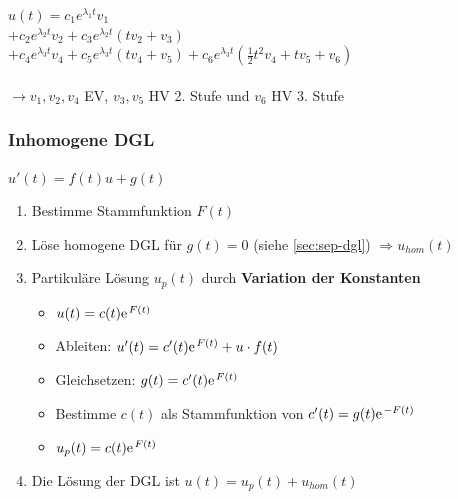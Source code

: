 \documentclass[6pt,a4paper]{scrartcl}
\renewcommand{\emph}[1]{\textbf{#1}}															%
\newcommand{\ra}[0]{\ensuremath{\rightarrow}} 									%
\begin{document}
\begin{multicols*}{4}
$u (t) = c_1 e^{\lambda_1 t} v_1$ \\
$+ c_2 e^{\lambda_2 t} v_2 + c_3 e^{\lambda_2 t}(tv_2 + v_3)$ \\
$+ c_4 e^{\lambda_3 t} v_4 + c_5 e^{\lambda_3 t}(tv_4 + v_5) + c_6 e^{\lambda_3 t} (\frac{1}{2} t^2 v_4 + tv_5 + v_6)$ \\
\\ \ra  $v_1, v_2, v_4$ EV, $v_3, v_5$ HV 2. Stufe und $v_6$ HV 3. Stufe
\fi
\subsubsection{Inhomogene DGL}
$\boxed{u'(t) = f(t)u + g(t)}$

\begin{enumerate}
	\itemsep0pt 
	\item Bestimme Stammfunktion $F(t)$
	\item Löse homogene DGL für $g(t) = 0$ (siehe \ref{sec:sep-dgl}) $\Rightarrow u_{hom}(t)$
	\item Partikuläre Lösung $u_p(t)$ durch \emph{Variation der Konstanten}
	\begin{itemize}\itemsep0pt 
		\item $u(t) = c(t) \e^{F(t)}$
		\item Ableiten: $u'(t) = c'(t)\e^{F(t)}+u\cdot f(t)$
		\item Gleichsetzen: $g(t) = c'(t)\e^{F(t)}$
		\item Bestimme $c(t)$ als Stammfunktion von $c'(t) = g(t)\e^{-F(t)}$
		\item $u_p(t) = c(t)\e^{F(t)}$
	\end{itemize}
	\item Die Lösung der DGL ist $u(t) = u_p(t) + u_{hom}(t)$
\end{enumerate}


\end{multicols*}
\end{document}
